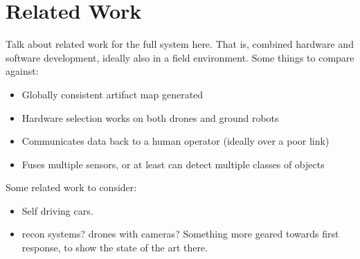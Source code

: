 \section{Related Work}

Talk about related work for the full system here. That is, combined hardware and software development, ideally also in a field environment. Some things to compare against:

\begin{itemize}
	\item Globally consistent artifact map generated
	\item Hardware selection works on both drones and ground robots
	\item Communicates data back to a human operator (ideally over a poor link)
	\item Fuses multiple sensors, or at least can detect multiple classes of objects
\end{itemize}

Some related work to consider:

\begin{itemize}
	\item Self driving cars.
	\item recon systems? drones with cameras? Something more geared towards first response, to show the state of the art there.
\end{itemize}